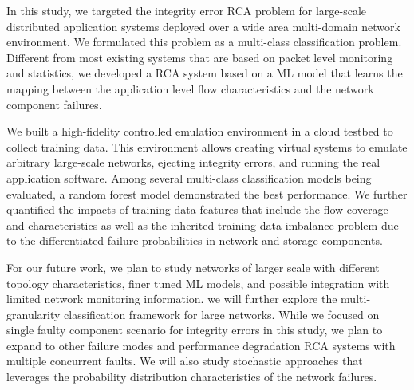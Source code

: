 In this study, we targeted the integrity error RCA problem for large-scale distributed application systems deployed over a wide area multi-domain network environment. We formulated this problem as a multi-class classification problem. Different from most existing systems that are based on packet level monitoring and statistics,  we developed a RCA system based on a ML model that learns the mapping between the application level flow characteristics and the network component failures. 

We built a high-fidelity controlled emulation environment in a cloud testbed to collect training data. This environment allows creating virtual systems to emulate arbitrary large-scale networks, ejecting integrity errors, and running the real application software. 
Among several multi-class classification models being evaluated, a random forest model demonstrated the best performance. We further quantified the impacts of training data features that include the flow coverage and characteristics as well as the inherited training data imbalance problem due to the differentiated failure probabilities in network and storage components. 

For our future work, we plan to study networks of larger scale with different topology characteristics, finer tuned ML models, and possible integration with limited network monitoring information. we will further explore the multi-granularity classification framework for large networks. While we focused on single faulty component scenario for integrity errors in this study, we plan to expand to other failure modes and performance degradation RCA systems with multiple concurrent faults. We will also study stochastic approaches that leverages the probability distribution characteristics of the network failures.  
